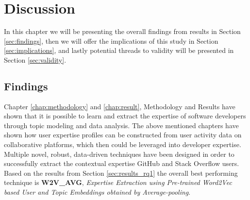 \chapter{Discussion\label{chap:discussion}}

    In this chapter we will be presenting the overall findings from results in Section \ref{sec:findings}, then we will offer the implications of this study in Section \ref{sec:implications}, and lastly potential threads to validity will be presented in Section \ref{sec:validity}.
            
    
    \section{Findings\label{sec:findings}}
        Chapter \ref{chap:methodology} and \ref{chap:result}, Methodology and Results have shown that it is possible to learn and extract the expertise of software developers through topic modeling and data analysis. The above mentioned chapters have shown how user expertise profiles can be constructed from user activity data on collaborative platforms, which then could be leveraged into developer expertise. Multiple novel, robust, data-driven techniques have been designed in order to successfully extract the contextual expertise GitHub and Stack Overflow users. Based on the results from Section \ref{sec:results_rq1} the overall best performing technique is \textbf{W2V\_AVG}, \emph{Expertise Extraction using Pre-trained Word2Vec based User and Topic Embeddings obtained by Average-pooling}. 
        
